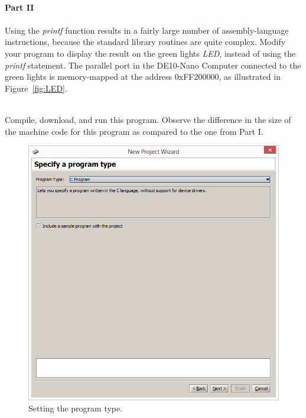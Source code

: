 \documentclass[epsfig,10pt,fullpage]{article}
\begin{document}
\begin{enumerate}
~\\
\noindent
{\bf Part II}
~\\
~\\
\noindent
Using the {\it printf} function results in a fairly large number of assembly-language instructions,
because the standard library routines are quite complex. Modify your program to display the 
result on the green lights {\it LED}, instead of using the {\it printf} statement. The
parallel port in the DE10-Nano Computer connected to the green lights is memory-mapped at the 
address {\sf 0xFF200000}, as illustrated in Figure~\ref{fig:LED}.

~\\
\noindent
Compile, download, and run this program. Observe the difference in the size of the
machine code for this program as compared to the one from Part I.

\begin{figure}[H]
	\begin{center}
	\includegraphics[scale=0.58]{figures/figureMP_progtype.png}
	\end{center}
	\vspace{-0.25cm}\caption{Setting the program type.}
\label{fig:MPprogtype}
\end{figure}


\end{enumerate}
\end{document}
